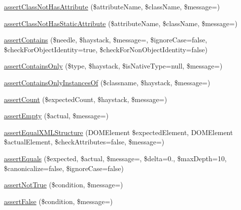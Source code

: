 \begin{DoxyCompactItemize}
\item 
\mbox{\hyperlink{_functions_8php_afed26231955c087c24c8f44adae4ca20}{assert\+Class\+Not\+Has\+Attribute}} (\$attribute\+Name, \$class\+Name, \$message=\textquotesingle{}\textquotesingle{})
\item 
\mbox{\hyperlink{_functions_8php_a89ea57c8417508bc6baee69be6ebc060}{assert\+Class\+Not\+Has\+Static\+Attribute}} (\$attribute\+Name, \$class\+Name, \$message=\textquotesingle{}\textquotesingle{})
\item 
\mbox{\hyperlink{_functions_8php_a1cfe93764a351b03451c52f70117d26a}{assert\+Contains}} (\$needle, \$haystack, \$message=\textquotesingle{}\textquotesingle{}, \$ignore\+Case=false, \$check\+For\+Object\+Identity=true, \$check\+For\+Non\+Object\+Identity=false)
\item 
\mbox{\hyperlink{_functions_8php_a844acff54e32f0f73a341d8b6f45b7eb}{assert\+Contains\+Only}} (\$type, \$haystack, \$is\+Native\+Type=null, \$message=\textquotesingle{}\textquotesingle{})
\item 
\mbox{\hyperlink{_functions_8php_ab045412068b996519bc1bce08fdb20bc}{assert\+Contains\+Only\+Instances\+Of}} (\$classname, \$haystack, \$message=\textquotesingle{}\textquotesingle{})
\item 
\mbox{\hyperlink{_functions_8php_af5e94843432a981837016d92afadb274}{assert\+Count}} (\$expected\+Count, \$haystack, \$message=\textquotesingle{}\textquotesingle{})
\item 
\mbox{\hyperlink{_functions_8php_aad72a8b4a8dcae8233307b939417857c}{assert\+Empty}} (\$actual, \$message=\textquotesingle{}\textquotesingle{})
\item 
\mbox{\hyperlink{_functions_8php_a24d5c38952d6ab4059377c640704d8a2}{assert\+Equal\+X\+M\+L\+Structure}} (D\+O\+M\+Element \$expected\+Element, D\+O\+M\+Element \$actual\+Element, \$check\+Attributes=false, \$message=\textquotesingle{}\textquotesingle{})
\item 
\mbox{\hyperlink{_functions_8php_a441ec5f09711b6271edda774132eec5f}{assert\+Equals}} (\$expected, \$actual, \$message=\textquotesingle{}\textquotesingle{}, \$delta=0., \$max\+Depth=10, \$canonicalize=false, \$ignore\+Case=false)
\item 
\mbox{\hyperlink{_functions_8php_a1bd0d1a88a6cfeaef9fe36ab6f31d527}{assert\+Not\+True}} (\$condition, \$message=\textquotesingle{}\textquotesingle{})
\item 
\mbox{\hyperlink{_functions_8php_a128860fa3b3f0455ec939bd3a9c9f310}{assert\+False}} (\$condition, \$message=\textquotesingle{}\textquotesingle{})

\end{DoxyCompactItemize}
